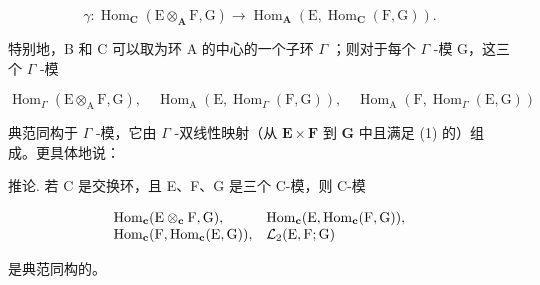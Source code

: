 \[
\gamma : \operatorname{Hom} _ {\mathbf {C}} (\mathrm{E} \otimes_ {\mathbf {A}} \mathrm{F}, \mathrm{G}) \rightarrow \operatorname{Hom} _ {\mathbf {A}} (\mathrm{E}, \operatorname{Hom} _ {\mathbf {C}} (\mathrm{F}, \mathrm{G})).\tag{6}
\]

特别地，B 和 C 可以取为环 A 的中心的一个子环 \(\Gamma\) ；则对于每个 \(\Gamma\) -模 G，这三个 \(\Gamma\) -模

\[
\operatorname{Hom} _ {\Gamma} (\mathrm{E} \otimes_ {\mathrm{A}} \mathrm{F}, \mathrm{G}), \quad \operatorname{Hom} _ {\mathrm{A}} (\mathrm{E}, \operatorname{Hom} _ {\Gamma} (\mathrm{F}, \mathrm{G})), \quad \operatorname{Hom} _ {\mathrm{A}} (\mathrm{F}, \operatorname{Hom} _ {\Gamma} (\mathrm{E}, \mathrm{G}))
\]

典范同构于 \(\Gamma\) -模，它由 \(\Gamma\) -双线性映射（从 \(\mathbf{E} \times \mathbf{F}\) 到 \(\mathbf{G}\) 中且满足 (1) 的）组成。更具体地说：

推论. 若 C 是交换环，且 E、F、G 是三个 C-模，则 C-模

\[
\begin{array}{l l} \operatorname{Hom} _ {\mathbf {c}} (\mathrm{E} \otimes_ {\mathbf {c}} \mathrm{F}, \mathrm{G}), & \operatorname{Hom} _ {\mathbf {c}} (\mathrm{E}, \operatorname{Hom} _ {\mathbf {c}} (\mathrm{F}, \mathrm{G})), \\ \operatorname{Hom} _ {\mathbf {c}} (\mathrm{F}, \operatorname{Hom} _ {\mathbf {c}} (\mathrm{E}, \mathrm{G})), & \mathcal {L} _ {2} (\mathrm{E}, \mathrm{F}; \mathrm{G}) \end{array}
\]

是典范同构的。
